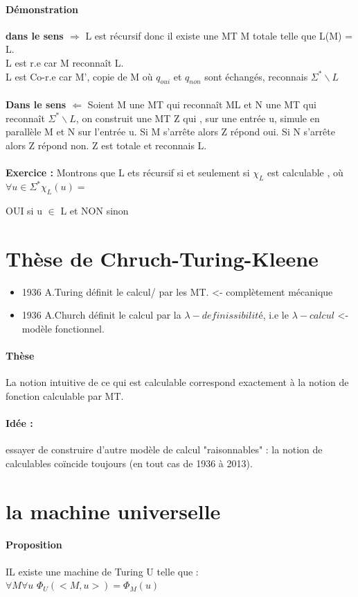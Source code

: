 \documentclass{article}
\begin{document}
\paragraph{Démonstration} \textbf{dans le sens $\Rightarrow$ }L est récursif donc il existe une MT M totale telle que L(M) = L.\\L est r.e car M reconnaît L.\\ L est Co-r.e car M', copie de M où $q_{oui}$ et $q_{non}$ sont échangés, reconnais $\Sigma^{*}\backslash L$\\\\
\textbf{Dans le sens $\Leftarrow$ } Soient M une MT qui reconnaît ML et N une MT qui reconnaît $\Sigma^{*}\backslash L$, on construit une MT Z qui , sur une entrée u, simule en parallèle M et N sur l'entrée u. Si M s’arrête alors Z répond oui. Si N s’arrête alors Z répond non. Z est totale et reconnais L.\\\\\textbf{Exercice : } Montrons que L ets récursif si et seulement si $\chi_{L}$ est calculable , où $\forall u \in \Sigma^{*} \chi_{L}(u) = ${OUI si u $\in$ L et NON sinon
\section{Thèse de Chruch-Turing-Kleene}
\begin{itemize}
\item 1936 A.Turing définit le calcul/ par les MT. <- complètement mécanique
\item 1936 A.Church définit le calcul par la $\lambda-definissibilité$, i.e le $\lambda-calcul$ <- modèle fonctionnel.
\end{itemize}
\paragraph{Thèse} La notion intuitive de ce qui est calculable correspond exactement à la notion de fonction calculable par MT.
\paragraph{Idée : } essayer de construire d'autre modèle de calcul "raisonnables" : la notion de calculables coïncide toujours (en tout cas de  1936 à 2013).
\section{la machine universelle} 
\paragraph{Proposition} IL existe une machine de Turing U telle que :\\ $\forall M\forall u$  $\Phi_{U}(<M,u>) = \Phi_{M}(u)$ 
}
\end{document}
